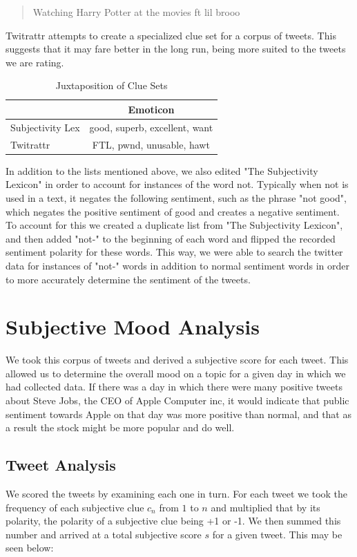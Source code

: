 \documentclass[11pt]{article}
\begin{document}
\begin{quote}
Watching Harry Potter at the movies ft lil brooo
\end{quote}
Twitrattr attempts to create a specialized clue set for a corpus of tweets. This suggests that it may fare better in the long run, being more suited to the tweets we are rating.

\begin{table}[ht!]
\centering
\caption{Juxtaposition of Clue Sets}
\begin{tabular}{|l|c|}
\hline
 & Emoticon \\
\hline
Subjectivity Lex& good, superb, excellent, want\\
\hline
Twitrattr & FTL, pwnd, unusable, hawt\\
\hline
\end{tabular}
\end{table}

In addition to the lists mentioned above, we also edited "The Subjectivity Lexicon" in order to account for instances of the word not.  Typically when not is used in a text, it negates the following sentiment, such as the phrase "not good", which negates the positive sentiment of good and creates a negative sentiment. To account for this we created a duplicate list from "The Subjectivity Lexicon", and then added "not-" to the beginning of each word and flipped the recorded sentiment polarity for these words.  This way, we were able to search the twitter data for instances of "not-" words in addition to normal sentiment words in order to more accurately determine the sentiment of the tweets.

\section{Subjective Mood Analysis}
We took this corpus of tweets and derived a subjective score for each tweet. This allowed us to determine the overall mood on a topic for a given day in which we had collected data. If there was a day in which there were many positive tweets about Steve Jobs, the CEO of Apple Computer inc, it would indicate that public sentiment towards Apple on that day was more positive than normal, and that as a result the stock might be more popular and do well.

\subsection{Tweet Analysis}
We scored the tweets by examining each one in turn. For each tweet we took the frequency of each subjective clue $c_{n}$ from $1$ to $n$ and multiplied that by its polarity, the polarity of a subjective clue being +1 or -1. We then summed this number and arrived at a total subjective score $s$ for a given tweet. This may be seen below:
\end{document}
